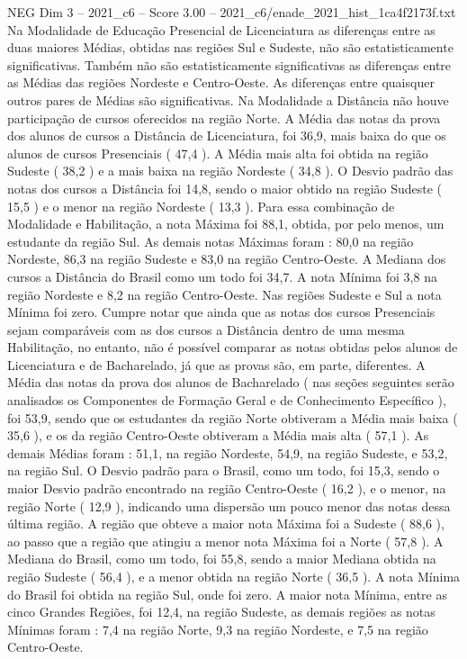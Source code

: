 \begin{textsample}{NEG Dim 3 – 2021\_c6 – Score 3.00 – 2021\_c6/enade\_2021\_hist\_1ca4f2173f.txt}
Na Modalidade de Educação Presencial de Licenciatura as diferenças entre as duas maiores Médias, obtidas nas regiões Sul e Sudeste, não são estatisticamente significativas.
Também não são estatisticamente significativas as diferenças entre as Médias das regiões Nordeste e Centro-Oeste.
As diferenças entre quaisquer outros pares de Médias são significativas.
Na Modalidade a Distância não houve participação de cursos oferecidos na região Norte.
A Média das notas da prova dos alunos de cursos a Distância de Licenciatura, foi 36,9, mais baixa do que os alunos de cursos Presenciais ( 47,4 ).
A Média mais alta foi obtida na região Sudeste ( 38,2 ) e a mais baixa na região Nordeste ( 34,8 ).
O Desvio padrão das notas dos cursos a Distância foi 14,8, sendo o maior obtido na região Sudeste ( 15,5 ) e o menor na região Nordeste ( 13,3 ).
Para essa combinação de Modalidade e Habilitação, a nota Máxima foi 88,1, obtida, por pelo menos, um estudante da região Sul.
As demais notas Máximas foram : 80,0 na região Nordeste, 86,3 na região Sudeste e 83,0 na região Centro-Oeste.
A Mediana dos cursos a Distância do Brasil como um todo foi 34,7.
A nota Mínima foi 3,8 na região Nordeste e 8,2 na região Centro-Oeste.
Nas regiões Sudeste e Sul a nota Mínima foi zero.
Cumpre notar que ainda que as notas dos cursos Presenciais sejam comparáveis com as dos cursos a Distância dentro de uma mesma Habilitação, no entanto, não é possível comparar as notas obtidas pelos alunos de Licenciatura e de Bacharelado, já que as provas são, em parte, diferentes.
A Média das notas da prova dos alunos de Bacharelado ( nas seções seguintes serão analisados os Componentes de Formação Geral e de Conhecimento Específico ), foi 53,9, sendo que os estudantes da região Norte obtiveram a Média mais baixa ( 35,6 ), e os da região Centro-Oeste obtiveram a Média mais alta ( 57,1 ).
As demais Médias foram : 51,1, na região Nordeste, 54,9, na região Sudeste, e 53,2, na região Sul.
O Desvio padrão para o Brasil, como um todo, foi 15,3, sendo o maior Desvio padrão encontrado na região Centro-Oeste ( 16,2 ), e o menor, na região Norte ( 12,9 ), indicando uma dispersão um pouco menor das notas dessa última região.
A região que obteve a maior nota Máxima foi a Sudeste ( 88,6 ), ao passo que a região que atingiu a menor nota Máxima foi a Norte ( 57,8 ).
A Mediana do Brasil, como um todo, foi 55,8, sendo a maior Mediana obtida na região Sudeste ( 56,4 ), e a menor obtida na região Norte ( 36,5 ).
A nota Mínima do Brasil foi obtida na região Sul, onde foi zero.
A maior nota Mínima, entre as cinco Grandes Regiões, foi 12,4, na região Sudeste, as demais regiões as notas Mínimas foram : 7,4 na região Norte, 9,3 na região Nordeste, e 7,5 na região Centro-Oeste.

\end{textsample}
